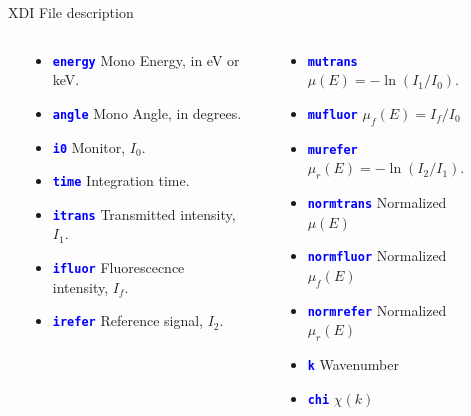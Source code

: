 \documentclass[final]{beamer}
\newcommand{\Color}[2]{{\textcolor{#1}{#2}}}
\newcommand{\Blue}[1]{{\Color{Blue}{\bf{#1}}}}
\begin{document}
\begin{frame}{}
\begin{columns}[t]
\begin{column}{.42\linewidth}
\begin{block}{\large XDI File description}
         \begin{columns}[T]
           \begin{column}{0.06\linewidth}
           \end{column}
           \begin{column}{0.41\linewidth}
             \begin{itemize}
             \item {\Blue{\tt{energy}}}  Mono Energy, in eV or keV.
             \item {\Blue{\tt{angle}}}   Mono Angle, in degrees.
             \item {\Blue{\tt{i0}}}      Monitor, $I_0$.
             \item {\Blue{\tt{time}}}    Integration time.
             \item {\Blue{\tt{itrans}}}  Transmitted intensity, $I_1$.
             \item {\Blue{\tt{ifluor}}}  Fluorescecnce intensity, $I_f$.
             \item {\Blue{\tt{irefer}}}  Reference signal, $I_2$.
             \end{itemize} 
           \end{column}
           \begin{column}{0.06\linewidth}
           \end{column}
           \begin{column}{0.41\linewidth}
               \begin{itemize}
               \item {\Blue{\tt{mutrans}}}   $\mu(E) = -\ln(I_1/I_0)$.
               \item {\Blue{\tt{mufluor}}}   $\mu_f(E) = I_f/I_0$
               \item {\Blue{\tt{murefer}}}   $\mu_r(E) = -\ln(I_2/I_1)$.
               \item {\Blue{\tt{normtrans}}} Normalized $\mu(E)$ 
               \item {\Blue{\tt{normfluor}}} Normalized $\mu_f(E)$ 
               \item {\Blue{\tt{normrefer}}} Normalized $\mu_r(E)$ 
               \item {\Blue{\tt{k}}}         Wavenumber
               \item {\Blue{\tt{chi}}}       $\chi(k)$
               \end{itemize}
           \end{column}
           \begin{column}{0.06\linewidth}
           \end{column}
         \end{columns}


\end{block}
\end{column}
\end{columns}
\end{frame}
\end{document}
